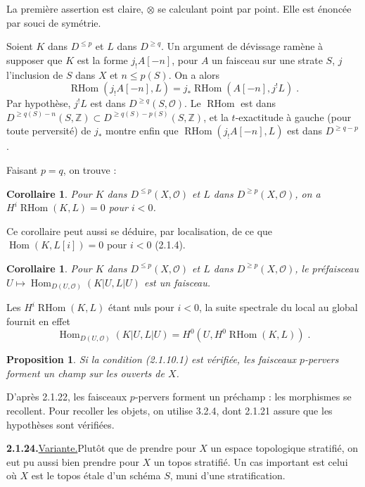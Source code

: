\documentclass[12pt,a4paper]{article}
\theoremstyle{plain}
\newtheorem{proposition}[theorem]{Proposition}
\newtheorem{corollary}[theorem]{Corollaire}
\theoremstyle{definition}
\DeclareMathOperator{\Hom}{Hom}
\DeclareMathOperator{\RHom}{RHom}
\begin{document}
La premi\`ere assertion est claire, $\otimes$ se calculant point par point. Elle est \'enonc\'ee par souci de sym\'etrie.

Soient $K$ dans $D^{\leqslant p}$ et $L$ dans $D^{\geqslant q}$. Un argument de d\'evissage ram\`ene \`a supposer que $K$ est la forme $j_! A[-n]$, pour $A$ un faisceau sur une strate $S$, $j$ l'inclusion de $S$ dans $X$ et $n \leqslant p(S)$. On a alors
\[
\RHom(j_! A[-n], L) = j_* \RHom(A[-n], j^! L)\;.
\]
Par hypoth\`ese, $j^! L$ est dans $D^{\geqslant q}(S, \mathcal{O})$. Le $\RHom$ est dans $D^{\geqslant q(S) - n}(S, \mathbb{Z}) \subset D^{\geqslant q(S) - p(S)}(S, \mathbb{Z})$, et la $t$-exactitude \`a gauche (pour toute perversit\'e) de $j_*$ montre enfin que $\RHom(j_! A[-n], L)$ est dans $D^{\geqslant q-p}$.

Faisant $p = q$, on trouve :

\begin{corollary}\label{cor:2.1.21}
Pour $K$ dans $D^{\leqslant p}(X, \mathcal{O})$ et $L$ dans $D^{\geqslant p}(X, \mathcal{O})$, on a $H^i \RHom(K, L) = 0$ pour $i < 0$.
\end{corollary}

Ce corollaire peut aussi se d\'eduire, par localisation, de ce que $\Hom(K, L[i]) = 0$ pour $i < 0$ (2.1.4).

\begin{corollary}\label{cor:2.1.22}
Pour $K$ dans $D^{\leqslant p}(X, \mathcal{O})$ et $L$ dans $D^{\geqslant p}(X, \mathcal{O})$, le pr\'efaisceau $U \mapsto \Hom_{D(U, \mathcal{O})}(K|U, L|U)$ est un faisceau.
\end{corollary}

Les $H^i \RHom(K, L)$ \'etant nuls pour $i < 0$, la suite spectrale du local au global fournit en effet
\[
\Hom_{D(U, \mathcal{O})}(K|U, L|U) = H^0(U, H^0 \RHom(K, L))\;.
\]

\begin{proposition}\label{prop:2.1.23}
Si la condition (2.1.10.1) est v\'erifi\'ee, les faisceaux $p$-pervers forment un champ sur les ouverts de $X$.
\end{proposition}

D'apr\`es 2.1.22, les faisceaux $p$-pervers forment un pr\'echamp : les morphismes se recollent. Pour recoller les objets, on utilise 3.2.4, dont 2.1.21 assure que les hypoth\`eses sont v\'erifi\'ees.

\smallskip
\noindent\textbf{2.1.24.}\quad \underline{Variante.}\quad Plut\^ot que de prendre pour $X$ un espace topologique stratifi\'e, on eut pu aussi bien prendre pour $X$ un topos stratifi\'e. Un cas important est celui o\`u $X$ est le topos \'etale d'un sch\'ema $S$, muni d'une stratification.
\end{document}
